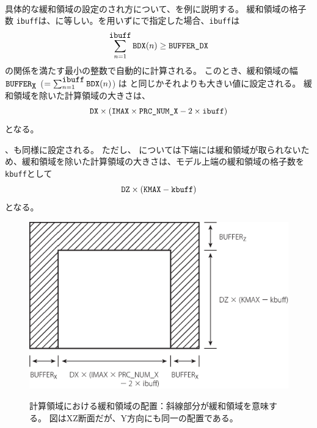 \\

具体的な緩和領域の設定のされ方について、{\XDIR}を例に説明する。
緩和領域の格子数 \verb|ibuff|は、に等しい。を用いずにで指定した場合、\verb|ibuff|は
\[
\sum_{n=1}^{\verb|ibuff|} \verb|BDX|(n) \ge \nmitemeq{BUFFER_DX} \nonumber
\]
の関係を満たす最小の整数で自動的に計算される。
このとき、緩和領域の幅 $\verb|BUFFER|_{\verb|X|}$ ($= \sum_{n=1}^{\verb|ibuff|} \verb|BDX|(n)$)
は  と同じかそれよりも大きい値に設定される。
緩和領域を除いた計算領域の大きさは、
\[
\nmitemeq{DX} \times ( \nmitemeq{IMAX} \times \nmitemeq{PRC_NUM_X} - 2 \times \verb|ibuff| )
\]
となる。

{\YDIR}、{\ZDIR}も同様に設定される。
ただし、{\ZDIR} については下端には緩和領域が取られないため、緩和領域を除いた計算領域の大きさは、モデル上端の緩和領域の格子数を\verb|kbuff|として
\[
\nmitemeq{DZ} \times ( \nmitemeq{KMAX} - \verb|kbuff| )
\]
となる。

\begin{figure}[t]
\begin{center}
  \includegraphics[width=0.8\hsize]{./figure/buffer_xz.eps}\\
  \caption{計算領域における緩和領域の配置：斜線部分が緩和領域を意味する。
  図はXZ断面だが、Y方向にも同一の配置である。}
  \label{fig:buff_xz}
\end{center}
\end{figure}

